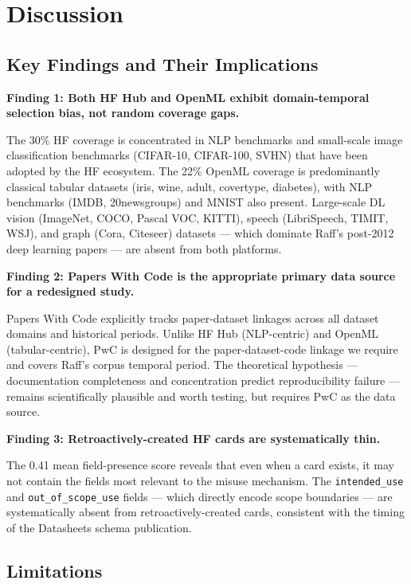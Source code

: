 \section{Discussion}
\label{sec:discussion}

\subsection{Key Findings and Their Implications}

\textbf{Finding 1: Both HF Hub and OpenML exhibit domain-temporal selection bias, not random coverage gaps.}

The 30\% HF coverage is concentrated in NLP benchmarks and small-scale image classification benchmarks (CIFAR-10, CIFAR-100, SVHN) that have been adopted by the HF ecosystem. The 22\% OpenML coverage is predominantly classical tabular datasets (iris, wine, adult, covertype, diabetes), with NLP benchmarks (IMDB, 20newsgroups) and MNIST also present. Large-scale DL vision (ImageNet, COCO, Pascal VOC, KITTI), speech (LibriSpeech, TIMIT, WSJ), and graph (Cora, Citeseer) datasets --- which dominate Raff's post-2012 deep learning papers --- are absent from both platforms.

\textbf{Finding 2: Papers With Code is the appropriate primary data source for a redesigned study.}

Papers With Code explicitly tracks paper-dataset linkages across all dataset domains and historical periods. Unlike HF Hub (NLP-centric) and OpenML (tabular-centric), PwC is designed for the paper-dataset-code linkage we require and covers Raff's corpus temporal period. The theoretical hypothesis --- documentation completeness and concentration predict reproducibility failure --- remains scientifically plausible and worth testing, but requires PwC as the data source.

\textbf{Finding 3: Retroactively-created HF cards are systematically thin.}

The 0.41 mean field-presence score reveals that even when a card exists, it may not contain the fields most relevant to the misuse mechanism. The \texttt{intended\_use} and \texttt{out\_of\_scope\_use} fields --- which directly encode scope boundaries --- are systematically absent from retroactively-created cards, consistent with the timing of the Datasheets schema publication.

\subsection{Limitations}

